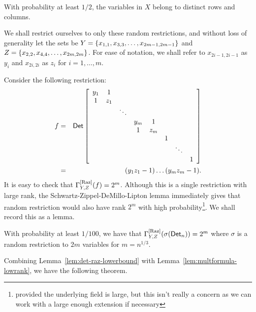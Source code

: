 \begin{claim}
With probability at least $1/2$, the variables in $X$ belong to distinct rows and columns. 
\end{claim}

We shall restrict ourselves to only these random restrictions, and without loss of generality let the sets be $Y = \left\{x_{1,1},x_{3,3},\dots,x_{2m-1,2m-1}\right\}$ and $Z = \left\{x_{2,2},x_{4,4},\dots, x_{2m,2m}\right\}$. For ease of notation, we shall refer to $x_{2i-1,2i-1}$ as $y_i$ and $x_{2i,2i}$ as $z_i$ for $i = 1,\dots, m$. 

Consider the following restriction:
\begin{eqnarray*}
f & = & \mathsf{Det} \left[ \begin{array}{cccccccc}
y_1 & 1   &        &     &     &  &        &   \\
1   & z_1 &        &     &     &  &        &   \\
    &     & \ddots &     &     &  &        &   \\
    &     &        & y_m &1    &  &        &   \\
    &     &        & 1   &z_m  &  &        &   \\
    &     &        &     &     & 1&        &   \\
    &     &        &     &     &  & \ddots &   \\
    &     &        &     &     &  &        & 1
  \end{array}\right]\\
 &= & (y_1z_1 - 1)\dots (y_mz_m - 1).
\end{eqnarray*}
It is easy to check that $\Gamma^{\mathrm{[Raz]}}_{Y,Z}(f) = 2^m$. Although this is a single restriction with large rank, the Schwartz-Zippel-DeMillo-Lipton lemma immediately gives that random restriction would also have rank $2^m$ with high probability\footnote{provided the underlying field is large, but this isn't really a concern as we can work with a large enough extension if necessary}. We shall record this as a lemma. 

\begin{lemma}\label{lem:det-raz-lowerbound}
With probability at least $1/100$, we have that $\Gamma^{\mathrm{[Raz]}}_{Y,Z}(\sigma(\mathsf{Det}_n)) = 2^m$ where $\sigma$ is a random restriction to $2m$ variables for $m = n^{1/3}$. 
\end{lemma}


Combining Lemma~\ref{lem:det-raz-lowerbound} with Lemma~\ref{lem:multformula-lowrank}, we have the following theorem. 

